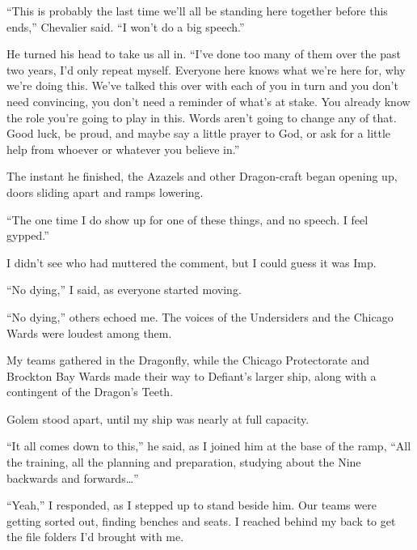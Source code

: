 ``This is probably the last time we'll all be standing here together before this ends,'' Chevalier said.  ``I won't do a big speech.''



He turned his head to take us all in.  ``I've done too many of them over the past two years, I'd only repeat myself.  Everyone here knows what we're here for, why we're doing this.  We've talked this over with each of you in turn and you don't need convincing, you don't need a reminder of what's at stake.  You already know the role you're going to play in this.  Words aren't going to change any of that.  Good luck, be proud, and maybe say a little prayer to God, or ask for a little help from whoever or whatever you believe in.''



The instant he finished, the Azazels and other Dragon-craft began opening up, doors sliding apart and ramps lowering.



``The one time I do show up for one of these things, and no speech.  I feel gypped.''



I didn't see who had muttered the comment, but I could guess it was Imp.



``No dying,'' I said, as everyone started moving.



``No dying,'' others echoed me.  The voices of the Undersiders and the Chicago Wards were loudest among them.



My teams gathered in the Dragonfly, while the Chicago Protectorate and Brockton Bay Wards made their way to Defiant's larger ship, along with a contingent of the Dragon's Teeth.



Golem stood apart, until my ship was nearly at full capacity.



``It all comes down to this,'' he said, as I joined him at the base of the ramp,  ``All the training, all the planning and preparation, studying about the Nine backwards and forwards\ldots''



``Yeah,'' I responded, as I stepped up to stand beside him.  Our teams were getting sorted out, finding benches and seats.  I reached behind my back to get the file folders I'd brought with me.



